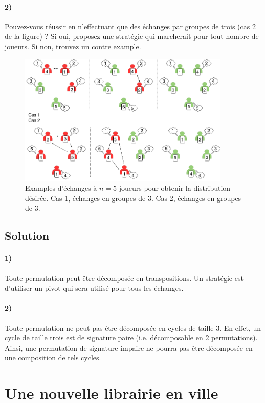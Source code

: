 \documentclass[a4paper,10pt,oneside]{article}
\begin{document}
\paragraph*{2)} 
Pouvez-vous réussir en n'effectuant que des échanges par groupes de trois (cas 2 de la figure) ?
Si oui, proposez une stratégie qui marcherait pour tout nombre de joueurs.
Si non, trouvez un contre example.

\begin{figure}[!h]
  \centering
  \includegraphics[width=0.9\textwidth]{figures/traders.png}
  \caption{Examples d'échanges à $n=5$ joueurs pour obtenir la distribution désirée. Cas 1, échanges en groupes de 3. Cas 2, échanges en groupes de 3.}
\end{figure}

\subsection{Solution}

\paragraph*{1)}
Toute permutation peut-être décomposée en transpositions. 
Un stratégie est d'utiliser un pivot qui sera utilisé pour tous les échanges.

\paragraph*{2)} 
Toute permutation ne peut pas être décomposée en cycles de taille 3. 
En effet, un cycle de taille trois est de signature paire (i.e. décomposable en 2 permutations).
Ainsi, une permutation de signature impaire ne pourra pas être décomposée en une composition de tels cycles.


\section{Une nouvelle librairie en ville}
\end{document}
